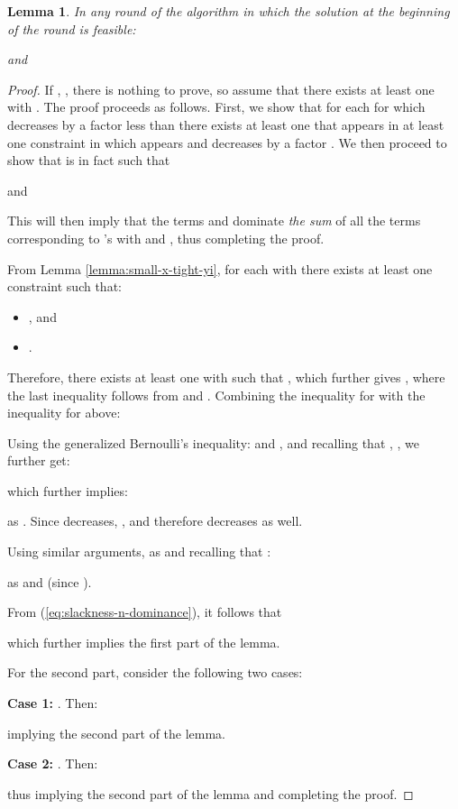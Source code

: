 \documentclass[11pt]{article}
\newtheorem{lemma}[theorem]{Lemma}
\begin{document}
\begin{lemma}\label{lemma:alpha>1-mul-increase-over-S-}
In any round of the algorithm in which the solution  at the beginning of the round is feasible:

and

\end{lemma}
\begin{proof}
If , , there is nothing to prove, so assume that there exists at least one  with . 
The proof proceeds as follows. First, we show that for each  for which  decreases by a factor less than  there exists at least one  that appears in at least one constraint  in which  appears and decreases by a factor . We then proceed to show that  is in fact such that 

and 

This will then imply that the terms  and  dominate \emph{the sum} of all the terms corresponding to 's with  and , thus completing the proof.

From Lemma \ref{lemma:small-x-tight-yi}, for each  with  there exists at least one constraint  such that:
\begin{itemize}
\item , and
\item .
\end{itemize}
Therefore, there exists at least one  with  such that , which further gives , where the last inequality follows from  and . Combining the inequality for  with the inequality for  above:



Using the generalized Bernoulli's inequality:  and  \cite{mitrinovic1970analytic}, and recalling that , , we further get:

which further implies:

as . Since  decreases, , and therefore  decreases as well.

Using similar arguments, as  and recalling that :


as  and  (since ).

From (\ref{eq:slackness-n-dominance}), it follows that 

which further implies the first part of the lemma.

For the second part, consider the following two cases:

\noindent\textbf{Case 1:} . Then:

implying the second part of the lemma.

\noindent\textbf{Case 2:} . Then:

thus implying the second part of the lemma and completing the proof.
\end{proof}
\end{document}
